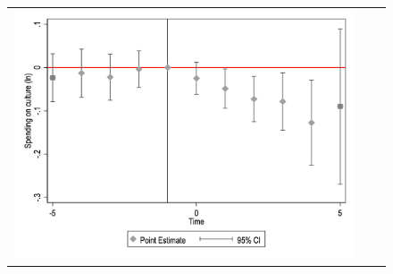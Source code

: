 \begin{figure}[!ht]
\begin{tabular}{@{}ccc@{}}
\begin{minipage}[t]{0.32\textwidth}
            \includegraphics[width=\linewidth]{images/pop_100000/caseventdd_ln_q4_05_step1.jpg}
            \label{fig:casculture}
        \end{minipage} \\[10pt]


\end{tabular}
\end{figure}
